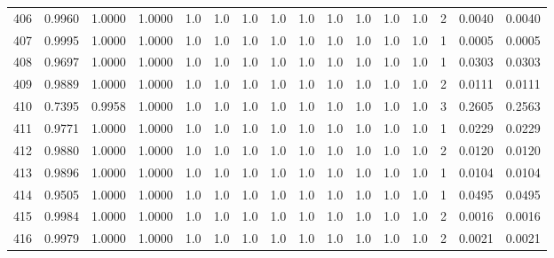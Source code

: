 \begin{tabular}{lrrrrrrrrrrrrrrr}
406 &      0.9960 &  1.0000 &  1.0000 &     1.0 &     1.0 &     1.0 &     1.0 &     1.0 &     1.0 &     1.0 &      1.0 &        1.0 &      2 &                    0.0040 &                     0.0040 \\
407 &      0.9995 &  1.0000 &  1.0000 &     1.0 &     1.0 &     1.0 &     1.0 &     1.0 &     1.0 &     1.0 &      1.0 &        1.0 &      1 &                    0.0005 &                     0.0005 \\
408 &      0.9697 &  1.0000 &  1.0000 &     1.0 &     1.0 &     1.0 &     1.0 &     1.0 &     1.0 &     1.0 &      1.0 &        1.0 &      1 &                    0.0303 &                     0.0303 \\
409 &      0.9889 &  1.0000 &  1.0000 &     1.0 &     1.0 &     1.0 &     1.0 &     1.0 &     1.0 &     1.0 &      1.0 &        1.0 &      2 &                    0.0111 &                     0.0111 \\
410 &      0.7395 &  0.9958 &  1.0000 &     1.0 &     1.0 &     1.0 &     1.0 &     1.0 &     1.0 &     1.0 &      1.0 &        1.0 &      3 &                    0.2605 &                     0.2563 \\
411 &      0.9771 &  1.0000 &  1.0000 &     1.0 &     1.0 &     1.0 &     1.0 &     1.0 &     1.0 &     1.0 &      1.0 &        1.0 &      1 &                    0.0229 &                     0.0229 \\
412 &      0.9880 &  1.0000 &  1.0000 &     1.0 &     1.0 &     1.0 &     1.0 &     1.0 &     1.0 &     1.0 &      1.0 &        1.0 &      2 &                    0.0120 &                     0.0120 \\
413 &      0.9896 &  1.0000 &  1.0000 &     1.0 &     1.0 &     1.0 &     1.0 &     1.0 &     1.0 &     1.0 &      1.0 &        1.0 &      1 &                    0.0104 &                     0.0104 \\
414 &      0.9505 &  1.0000 &  1.0000 &     1.0 &     1.0 &     1.0 &     1.0 &     1.0 &     1.0 &     1.0 &      1.0 &        1.0 &      1 &                    0.0495 &                     0.0495 \\
415 &      0.9984 &  1.0000 &  1.0000 &     1.0 &     1.0 &     1.0 &     1.0 &     1.0 &     1.0 &     1.0 &      1.0 &        1.0 &      2 &                    0.0016 &                     0.0016 \\
416 &      0.9979 &  1.0000 &  1.0000 &     1.0 &     1.0 &     1.0 &     1.0 &     1.0 &     1.0 &     1.0 &      1.0 &        1.0 &      2 &                    0.0021 &                     0.0021 \\

\end{tabular}
